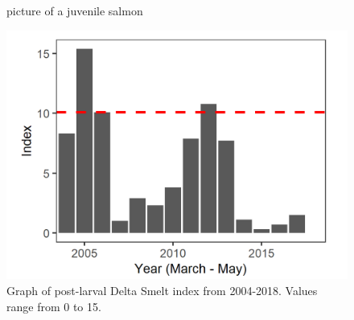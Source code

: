 \documentclass[
]{book}
\begin{document}
\begin{panel-grid}
\begin{columns-nocenter}
\begin{column800}
\begin{figure}
{}

\caption{picture of a juvenile salmon}\label{fig:unnamed-chunk-42}
\end{figure}

\end{column800}

\end{columns-nocenter}

\begin{columns-nocenter}

\begin{column800}

\begin{expand}

\begin{figure}
\includegraphics[width=15.25in]{figures/20mm_DSM_recent} \caption{Graph of post-larval Delta Smelt index from 2004-2018. Values range from 0 to 15.}\label{fig:unnamed-chunk-43}
\end{figure}

\end{expand}

\end{column800}

\begin{column40}

~

\end{column40}

\begin{column800}

\begin{expand}


\end{expand}
\end{column800}
\end{columns-nocenter}
\end{panel-grid}
\end{document}
